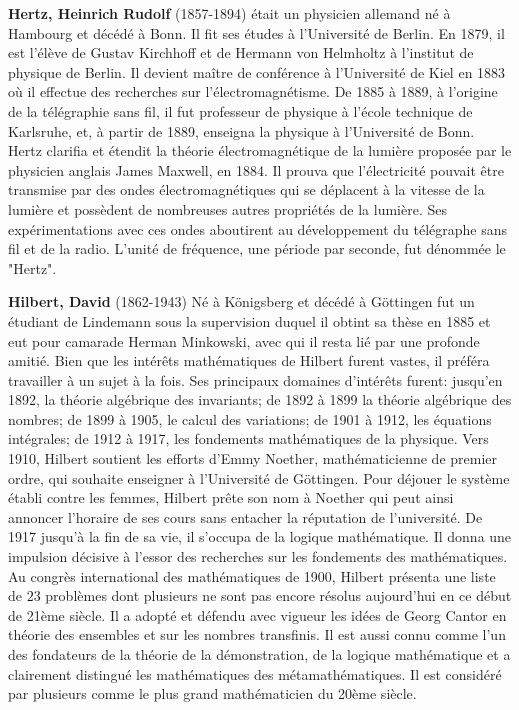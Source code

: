 \textbf{Hertz, Heinrich Rudolf} (1857-1894) était un physicien allemand né à Hambourg et décédé à Bonn. Il fit ses études à l'Université de Berlin. En 1879, il est l'élève de Gustav Kirchhoff et de Hermann von Helmholtz à l'institut de physique de Berlin. Il devient maître de conférence à l'Université de Kiel en 1883 où il effectue des recherches sur l'électromagnétisme. De 1885 à 1889, à l'origine de la télégraphie sans fil, il fut professeur de physique à l'école technique de Karlsruhe, et, à partir de 1889, enseigna la physique à l'Université de Bonn. Hertz clarifia et étendit la théorie électromagnétique de la lumière proposée par le physicien anglais James Maxwell, en 1884. Il prouva que l'électricité pouvait être transmise par des ondes électromagnétiques qui se déplacent à la vitesse de la lumière et possèdent de nombreuses autres propriétés de la lumière. Ses expérimentations avec ces ondes aboutirent au développement du télégraphe sans fil et de la radio. L'unité de fréquence, une période par seconde, fut dénommée le "Hertz".

\textbf{Hilbert, David} (1862-1943) Né à Königsberg et décédé à Göttingen fut un étudiant de Lindemann sous la supervision duquel il obtint sa thèse en 1885 et eut pour camarade Herman Minkowski, avec qui il resta lié par une profonde amitié. Bien que les intérêts mathématiques de Hilbert furent vastes, il préféra travailler à un sujet à la fois. Ses principaux domaines d'intérêts furent: jusqu'en 1892, la théorie algébrique des invariants; de 1892 à 1899 la théorie algébrique des nombres; de 1899 à 1905, le calcul des variations; de 1901 à 1912, les équations intégrales; de 1912 à 1917, les fondements mathématiques de la physique. Vers 1910, Hilbert soutient les efforts d'Emmy Noether, mathématicienne de premier ordre, qui souhaite enseigner à l'Université de Göttingen. Pour déjouer le système établi contre les femmes, Hilbert prête son nom à Noether qui peut ainsi annoncer l'horaire de ses cours sans entacher la réputation de l'université. De 1917 jusqu'à la fin de sa vie, il s'occupa de la logique mathématique. Il donna une impulsion décisive à l'essor des recherches sur les fondements des mathématiques. Au congrès international des mathématiques de 1900, Hilbert présenta une liste de $23$ problèmes dont plusieurs ne sont pas encore résolus aujourd'hui en ce début de 21ème siècle. Il a adopté et défendu avec vigueur les idées de Georg Cantor en théorie des ensembles et sur les nombres transfinis. Il est aussi connu comme l'un des fondateurs de la théorie de la démonstration, de la logique mathématique et a clairement distingué les mathématiques des métamathématiques. Il est considéré par plusieurs comme le plus grand mathématicien du 20ème siècle.


